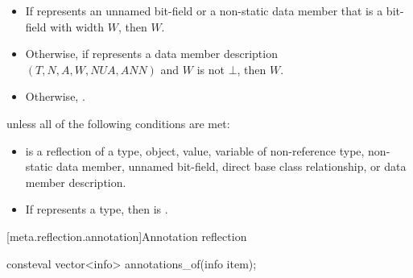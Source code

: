 \begin{itemdescr}
\pnum
\returns
\begin{itemize}
\item
  If  represents
  an unnamed bit-field
  or a non-static data member that is a bit-field
  with width $W$,
  then $W$.
\item
  Otherwise, if  represents a data member description
  $(T, N, A, W, \mathit{NUA}, \mathit{ANN})$
  and $W$ is not $\bot$,
  then $W$.
\item
  Otherwise, .
\end{itemize}

\pnum
\throws
{} unless
all of the following conditions are met:
\begin{itemize}
\item
{} is a reflection of a
type,
object,
value,
variable of non-reference type,
non-static data member,
unnamed bit-field,
direct base class relationship, or
data member description.
\item
If  represents a type,
then  is .
\end{itemize}
\end{itemdescr}

[meta.reflection.annotation]{Annotation reflection}

%
\begin{itemdecl}
consteval vector<info> annotations_of(info item);
\end{itemdecl}

